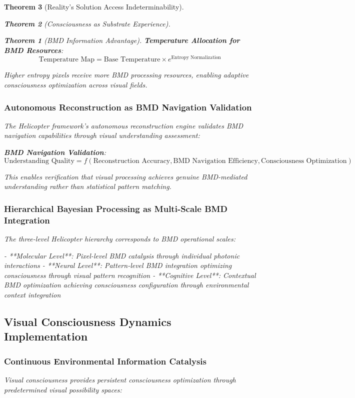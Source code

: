 \documentclass[12pt,a4paper]{article}
\newtheorem{theorem}{Theorem}[section]
\theoremstyle{remark}
\begin{document}
\begin{theorem}[Reality's Solution Access Indeterminability]
\begin{theorem}[Consciousness as Substrate Experience]
\begin{theorem}[BMD Information Advantage]
{\textbf{Temperature Allocation for BMD Resources}:
$$\text{Temperature Map} = \text{Base Temperature} \times e^{\text{Entropy Normalization}}$$

Higher entropy pixels receive more BMD processing resources, enabling adaptive consciousness optimization across visual fields.

\subsubsection{Autonomous Reconstruction as BMD Navigation Validation}

The Helicopter framework's autonomous reconstruction engine validates BMD navigation capabilities through visual understanding assessment:

\textbf{BMD Navigation Validation}:
$$\text{Understanding Quality} = f(\text{Reconstruction Accuracy}, \text{BMD Navigation Efficiency}, \text{Consciousness Optimization})$$

This enables verification that visual processing achieves genuine BMD-mediated understanding rather than statistical pattern matching.

\subsubsection{Hierarchical Bayesian Processing as Multi-Scale BMD Integration}

The three-level Helicopter hierarchy corresponds to BMD operational scales:

- **Molecular Level**: Pixel-level BMD catalysis through individual photonic interactions
- **Neural Level**: Pattern-level BMD integration optimizing consciousness through visual pattern recognition  
- **Cognitive Level**: Contextual BMD optimization achieving consciousness configuration through environmental context integration

\subsection{Visual Consciousness Dynamics Implementation}

\subsubsection{Continuous Environmental Information Catalysis}

Visual consciousness provides persistent consciousness optimization through predetermined visual possibility spaces:

}
\end{theorem}
\end{theorem}
\end{theorem}
\end{document}
